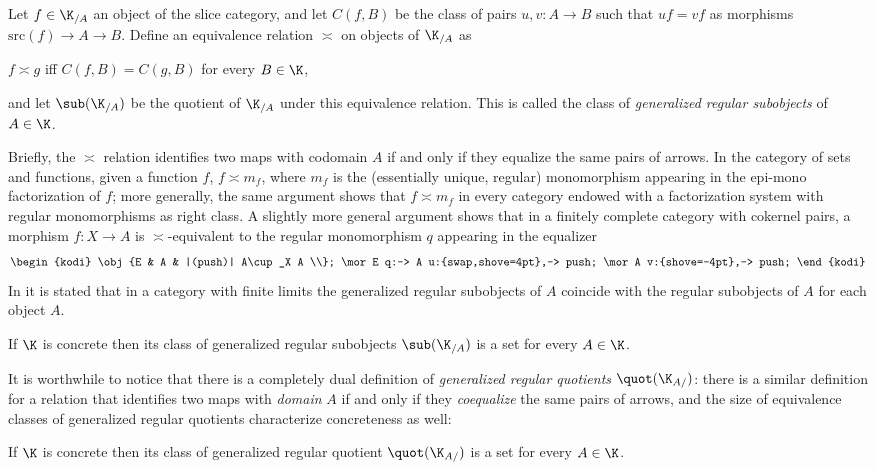 \begin{definition}\label{grsdef} Let $f\in
\K_{/A}$ an object of the slice category, and let $C(f,B)$ be the class of pairs
$u,v : A \to B$ such that $uf=vf$ as morphisms $\text{src}(f) \to A \to B$.
Define an equivalence relation $\asymp$ on objects of $\K_{/A}$ as
\begin{center}
$f\asymp g$ iff $C(f,B)=C(g,B)$ for every $B\in\K$, 
\end{center}
and let $\sub(\K_{/A})$ be the quotient of $\K_{/A}$ under this
equivalence relation. This is called the class of \emph{generalized regular
subobjects} of $A\in\K$.
\begin{remark}
Briefly, the $\asymp$ relation identifies two maps with codomain $A$ if and only if they equalize the same pairs of arrows. In the category of sets and functions, given a function $f$, $f\asymp m_f$, where $m_f$ is the (essentially unique, regular) monomorphism appearing in the epi-mono factorization of $f$; more generally, the same argument shows that $f\asymp m_f$ in every category endowed with a factorization system with regular monomorphisms as right class. A slightly more general argument shows that in a finitely complete category with cokernel pairs, a morphism $f \colon X\to A$ is $\asymp$-equivalent to the regular monomorphism $q$ appearing in the equalizer
\[\notag
\begin{kodi}
\obj{E & A & |(push)| A\cup_X A \\};
\mor E q:-> A u:{swap,shove=4pt},-> push;
\mor A v:{shove=-4pt},-> push;
\end{kodi}
\]
In \cite{freyd1973concreteness} it is stated that in a category with finite limits the generalized regular subobjects of $A$ coincide with the regular subobjects of $A$ for each object $A$.
\end{remark}
\end{definition}
\begin{proposition}\label{isbell}
If $\K$ is concrete then its class of generalized regular subobjects $\sub(\K_{/A})$ is a set for every $A\in\K$.
\end{proposition}
It is worthwhile to notice that there is a completely dual definition of \emph{generalized regular quotients} $\quot(\K_{A/})$: there is a similar definition for a relation that identifies two maps with \emph{domain} $A$ if and only if they \emph{coequalize} the same pairs of arrows, and the size of equivalence classes of generalized regular quotients characterize concreteness as well:
\begin{proposition}\label{coisbell}
If $\K$ is concrete then its class of generalized regular quotient $\quot(\K_{A/})$ is a set for every $A\in\K$.
\end{proposition}

